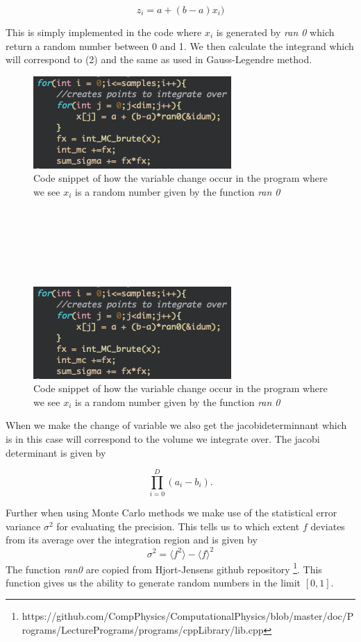 \documentclass[twoside,twocolumn]{article}
\begin{document}
\begin{equation}
z_i = a + (b-a) x_i)
\end{equation}

This is simply implemented in the code where $x_i$ is generated by \textit{ran 0} which return a random number between 0 and 1. We then calculate the integrand which will correspond to (2) and the same as used in Gauss-Legendre method.
\begin{figure}[h]
\center
\caption{Code snippet of how the variable change occur in the program where we see $x_i$ is a random number given by the function \textit{ran 0}}
\includegraphics[scale=0.55]{var.png}

\end{figure}
\\
\\
\\
\\
\\
\begin{figure}[h]
\center
\caption{Code snippet of how the variable change occur in the program where we see $x_i$ is a random number given by the function \textit{ran 0}}
\includegraphics[scale=0.55]{var.png}

\end{figure}
When we make the change of variable we also get the jacobideterminnant which is in this case will correspond to the volume we integrate over. The jacobi determinant is given by

\begin{equation}
 \prod\limits_{i=0}^D (a_i - b_i).
\end{equation}

Further when using Monte Carlo methods we make use of the statistical error variance $\sigma^2$ for evaluating the precision. This tells us to which extent $f$ deviates from its average over the integration region and is given by
\begin{equation} 
	\sigma^2	= \langle f^2\rangle -{\langle f \rangle}^2
\end{equation}
The function \textit{ran0}  are copied from Hjort-Jensens github repository \footnote{https://github.com/CompPhysics/ComputationalPhysics/blob/master/doc/Programs/LecturePrograms/programs/cppLibrary/lib.cpp}. This function gives us the ability to generate random numbers in the limit $[0,1]$.
\end{document}
